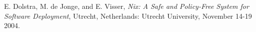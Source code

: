 \documentclass[conference]{IEEEtran}
\begin{document}
\begin{thebibliography}{1}

 E. Dolstra, M. de Jonge, and E. Visser, \emph{Nix: A Safe and Policy-Free System for Software Deployment}, Utrecht, Netherlands: Utrecht University, November 14-19 2004.







\end{thebibliography}

\end{document}
